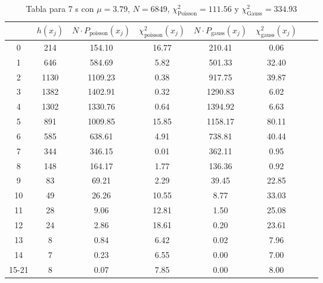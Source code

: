 \begin{center}
\begin{table}[H]
\caption{Tabla para 7 s con $\mu=3.79$, $N=6849$, $\chi^2_{\text{Poisson}}=111.56$  y $\chi^2_{\text{Gauss}}=334.93$}
\label{Tab:histo_m_7s}
\begin{tabular}{cccccccc}
\toprule
 & $h(x_j)$ & $N \cdot P_{\text{poisson}} (x_j)$ & $\chi^2_{\text{poisson}}(x_j)$ & $N \cdot P_{\text{gauss}} (x_j)$ & $\chi^2_{\text{gauss}}(x_j)$ \\
\midrule
0 & \num{  214} & \num{154.10} & \num{16.77} & \num{210.41} & \num{0.06} \\
1 & \num{  646} & \num{584.69} & \num{5.82} & \num{501.33} & \num{32.40} \\
2 & \num{ 1130} & \num{1109.23} & \num{0.38} & \num{917.75} & \num{39.87} \\
3 & \num{ 1382} & \num{1402.91} & \num{0.32} & \num{1290.83} & \num{6.02} \\
4 & \num{ 1302} & \num{1330.76} & \num{0.64} & \num{1394.92} & \num{6.63} \\
5 & \num{  891} & \num{1009.85} & \num{15.85} & \num{1158.17} & \num{80.11} \\
6 & \num{  585} & \num{638.61} & \num{4.91} & \num{738.81} & \num{40.44} \\
7 & \num{  344} & \num{346.15} & \num{0.01} & \num{362.11} & \num{0.95} \\
8 & \num{  148} & \num{164.17} & \num{1.77} & \num{136.36} & \num{0.92} \\
9 & \num{   83} & \num{69.21} & \num{2.29} & \num{39.45} & \num{22.85} \\
10 & \num{   49} & \num{26.26} & \num{10.55} & \num{8.77} & \num{33.03} \\
11 & \num{   28} & \num{9.06} & \num{12.81} & \num{1.50} & \num{25.08} \\
12 & \num{   24} & \num{2.86} & \num{18.61} & \num{0.20} & \num{23.61} \\
13 & \num{    8} & \num{0.84} & \num{6.42} & \num{0.02} & \num{7.96} \\
14 & \num{    7} & \num{0.23} & \num{6.55} & \num{0.00} & \num{7.00} \\
15-21 & \num{    8} & \num{0.07} & \num{7.85} & \num{0.00} & \num{8.00} \\
\bottomrule
\end{tabular}
\end{table}
\end{center}
